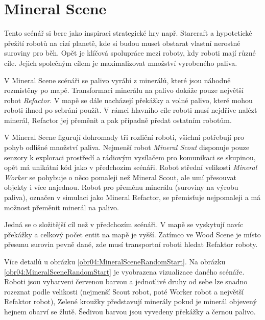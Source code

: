 	\clearpage
\section{Mineral Scene}
Tento scénář si bere jako inspiraci strategické hry např. Starcraft \citep*{starcraft} a hypotetické přežití robotů na cizí planetě, kde si budou muset obstarat vlastní nerostné suroviny pro běh. Opět je klíčová spolupráce mezi roboty, kdy roboti mají různé cíle. Jejich společným cílem je maximalizovat množství vyrobeného paliva.
\par 
V Mineral Scene scénáři se palivo vyrábí z minerálů, které jsou náhodně rozmístěny po mapě. Transformaci minerálu na palivo dokáže pouze největší robot \textit{Refactor}. V mapě se dále nacházejí překážky a volné palivo, které mohou roboti ihned po sebrání použít. V rámci hlavního cíle roboti musí nejdříve nalézt minerál, Refactor jej přeměnit a pak případně předat ostatním robotům. 
\par
V Mineral Scene figurují dohromady tři rozliční roboti, všichni potřebují pro pohyb odlišné množství paliva. Nejmenší robot \textit{Mineral Scout} disponuje pouze senzory k exploraci prostředí a rádiovým vysílačem pro komunikaci se skupinou, opět má unikátní kód  jako v předchozím scénáři. Robot střední velikosti \textit{Mineral Worker} se pohybuje o něco pomaleji než Mineral Scout, ale umí přesouvat objekty i více najednou. Robot pro přeměnu minerálu (suroviny na výrobu paliva), označen v simulaci jako Mineral Refactor, se přemisťuje nejpomaleji a má možnost přeměnit minerál na palivo. 
\par
Jedná se o složitější cíl než v předchozím scénáři. V mapě se vyskytují navíc překážky a celkový počet entit na mapě je vyšší. Zatímco ve Wood Scene je místo přesunu surovin pevně dané, zde musí transportní roboti hledat Refaktor roboty.
\par 
Více detailů u obrázku \ref{obr04:MineralSceneRandomStart}.
\newpage
Na obrázku \ref{obr04:MineralSceneRandomStart} je vyobrazena vizualizace daného scénáře. Roboti jsou vybarveni červenou barvou a jednotlivé druhy od sebe lze snadno rozeznat podle velikosti (nejmenší Scout robot, poté Worker robot a největší Refaktor robot), Zelené kroužky představují minerály pokud je minerál objevený hejnem obarví se žlutě. Šedivou barvou jsou vyvedeny překážky a černou palivo.

